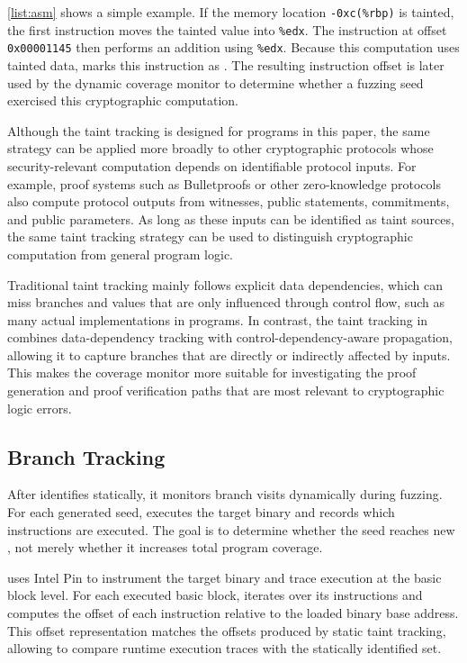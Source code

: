 \autoref{list:asm} shows a simple example. If the memory location \texttt{-0xc(\%rbp)} is tainted, the first instruction moves the tainted value into \texttt{\%edx}. The instruction at offset \texttt{0x00001145} then performs an addition using \texttt{\%edx}. Because this computation uses tainted data, \greyboxfuzz marks this instruction as \cryptobranch. The resulting instruction offset is later used by the dynamic coverage monitor to determine whether a fuzzing seed exercised this cryptographic computation.

Although the taint tracking is designed for \zksnark programs in this paper, the same strategy can be applied more broadly to other cryptographic protocols whose security-relevant computation depends on identifiable protocol inputs. For example, proof systems such as Bulletproofs or other zero-knowledge protocols also compute protocol outputs from witnesses, public statements, commitments, and public parameters. As long as these inputs can be identified as taint sources, the same taint tracking strategy can be used to distinguish cryptographic computation from general program logic. 

Traditional taint tracking mainly follows explicit data dependencies, which can miss branches and values that are only influenced through control flow, such as many actual implementations in \zksnark programs. In contrast, the taint tracking in \greyboxfuzz combines data-dependency tracking with control-dependency-aware propagation, allowing it to capture branches that are directly or indirectly affected by \zksnark inputs. This makes the coverage monitor more suitable for investigating the proof generation and proof verification paths that are most relevant to cryptographic logic errors.

\subsection{Branch Tracking}
\label{subsec:greybox-branch_tracking}

After \greyboxfuzz identifies \cryptobranch statically, it monitors branch visits dynamically during fuzzing. For each generated seed, \greyboxfuzz executes the target binary and records which instructions are executed. The goal is to determine whether the seed reaches new \cryptobranch, not merely whether it increases total program coverage.

\greyboxfuzz uses Intel Pin to instrument the target binary and trace execution at the basic block level. For each executed basic block, \greyboxfuzz iterates over its instructions and computes the offset of each instruction relative to the loaded binary base address. This offset representation matches the offsets produced by static taint tracking, allowing \greyboxfuzz to compare runtime execution traces with the statically identified \cryptobranch set.


